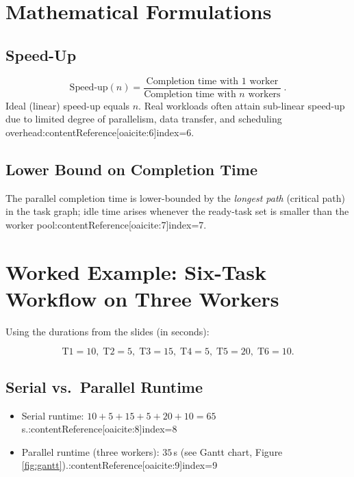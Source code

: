 \documentclass[11pt]{article}
\begin{document}
\section{Mathematical Formulations}

\subsection{Speed-Up}

\[
\text{Speed-up}(n)=
\frac{\text{Completion time with 1 worker}}
     {\text{Completion time with $n$ workers}}\;.
\]
Ideal (linear) speed-up equals $n$.  Real workloads often attain sub-linear speed-up due to limited degree of parallelism, data transfer, and scheduling overhead:contentReference[oaicite:6]{index=6}.

\subsection{Lower Bound on Completion Time}

The parallel completion time is lower-bounded by the \emph{longest path} (critical path) in the task graph; idle time arises whenever the ready-task set is smaller than the worker pool:contentReference[oaicite:7]{index=7}.

\section{Worked Example: Six-Task Workflow on Three Workers}

Using the durations from the slides (in seconds):

\[
\text{T1}=10,\;
\text{T2}=5,\;
\text{T3}=15,\;
\text{T4}=5,\;
\text{T5}=20,\;
\text{T6}=10.
\]

\subsection{Serial vs.\ Parallel Runtime}

\begin{itemize}[itemsep=0pt]
  \item Serial runtime: $10+5+15+5+20+10 = 65\,$s.:contentReference[oaicite:8]{index=8}
  \item Parallel runtime (three workers): $35\,$s (see Gantt chart, Figure \ref{fig:gantt}).:contentReference[oaicite:9]{index=9}
\end{itemize}
\end{document}
